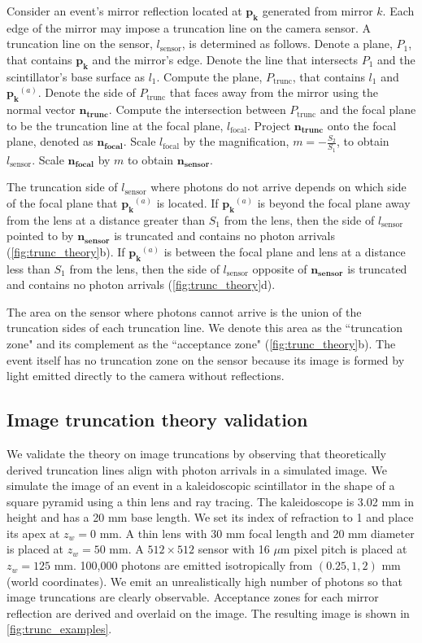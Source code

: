 Consider an event's mirror reflection located at $\bm{p_k}$ generated from mirror $k$.
Each edge of the mirror may impose a truncation line on the camera sensor.
A truncation line on the sensor, $l_\text{sensor}$, is determined as follows.
Denote a plane, $P_1$, that contains $\bm{p_k}$ and the 
mirror's edge.
Denote the line that intersects $P_1$ and the scintillator's base surface as $l_1$.
Compute the plane, $P_{\text{trunc}}$, that contains $l_1$ and $\bm{p_k}^{(a)}$.
Denote the side of $P_{\text{trunc}}$ that faces away from the mirror using the 
normal vector $\bm{n_{\text{trunc}}}$.
Compute the intersection between $P_{\text{trunc}}$ and the focal plane to be the
truncation line at the focal plane, $l_\text{focal}$.
Project $\bm{n_{\text{trunc}}}$ onto the focal plane, denoted as 
$\bm{n_{\text{focal}}}$.
Scale $l_\text{focal}$ by the magnification, $m=-\frac{S_2}{S_1}$, to obtain $l_\text{sensor}$.
Scale $\bm{n_{\text{focal}}}$ by $m$ to obtain $\bm{n_{\text{sensor}}}$.

The truncation side of $l_\text{sensor}$ where photons do not arrive depends on 
which side of the focal plane that $\bm{p_k}^{(a)}$ is located.
If $\bm{p_k}^{(a)}$ is beyond the focal plane away from the lens at a distance 
greater than $S_1$ from the lens, 
then the side of $l_\text{sensor}$ pointed to by $\bm{n_{\text{sensor}}}$ is 
truncated and contains no photon arrivals (\cref{fig:trunc_theory}b).
If $\bm{p_k}^{(a)}$ is between the focal plane and lens at a distance less than 
$S_1$ from the lens, 
then the side of $l_\text{sensor}$ opposite of $\bm{n_{\text{sensor}}}$ 
is truncated and contains no photon arrivals (\cref{fig:trunc_theory}d).

The area on the sensor where photons cannot arrive is the union of the
truncation sides of each truncation line.
We denote this area as the ``truncation zone" and its complement as the 
``acceptance zone" (\cref{fig:trunc_theory}b).
The event itself has no truncation zone on the sensor because its image is formed 
by light emitted directly to the camera without reflections.


\subsection{Image truncation theory validation}
We validate the theory on image truncations by observing that theoretically 
derived truncation lines align with photon arrivals in a simulated image.
We simulate the image of an event in a kaleidoscopic scintillator in the shape of 
a square pyramid using a thin lens and ray tracing. 
The kaleidoscope is 3.02 mm in height and has a 20 mm base length.
We set its index of refraction to 1 and place its apex at $z_w=0$ mm.
A thin lens with 30 mm focal length and 20 mm diameter is placed at $z_w=50$ mm.
A $512 \times 512$ sensor with 16 $\mu$m pixel pitch is placed at $z_w=125$ mm.
100,000 photons are emitted isotropically from $(0.25, 1, 2)$ mm (world 
coordinates).
We emit an unrealistically high number of photons so that image truncations are 
clearly observable.
Acceptance zones for each mirror reflection are derived and overlaid on the image.
The resulting image is shown in \cref{fig:trunc_examples}.

